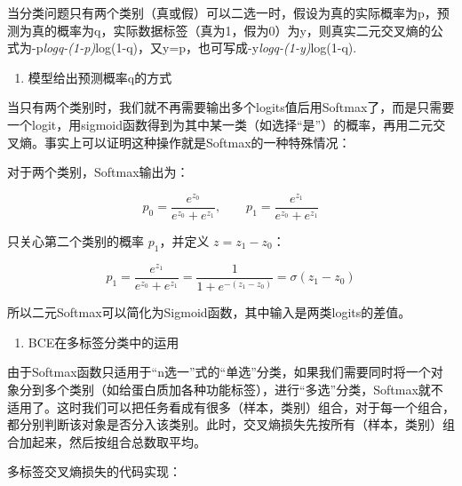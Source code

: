 当分类问题只有两个类别（真或假）可以二选一时，假设为真的实际概率为p，预测为真的概率为q，实际数据标签（真为1，假为0）为y，则真实二元交叉熵的公式为-p\emph{logq-(1-p)}log(1-q)，又y=p，也可写成-y\emph{logq-(1-y)}log(1-q).

\begin{enumerate}
\def\labelenumi{\arabic{enumi}.}
\setcounter{enumi}{1}
\tightlist
\item
  模型给出预测概率q的方式
\end{enumerate}

当只有两个类别时，我们就不再需要输出多个logits值后用Softmax了，而是只需要一个logit，用sigmoid函数得到为其中某一类（如选择``是''）的概率，再用二元交叉熵。事实上可以证明这种操作就是Softmax的一种特殊情况：

对于两个类别，Softmax输出为：

\[
p_0=\frac{e^{z_0}}{e^{z_0}+e^{z_1}},\qquad
p_1=\frac{e^{z_1}}{e^{z_0}+e^{z_1}}
\]

只关心第二个类别的概率 \(p_1\)，并定义 \(z=z_1-z_0\)：

\[
p_1=\frac{e^{z_1}}{e^{z_0}+e^{z_1}}
=\frac{1}{1+e^{-(z_1-z_0)}}
=\sigma(z_1-z_0)
\]

所以二元Softmax可以简化为Sigmoid函数，其中输入是两类logits的差值。

\begin{enumerate}
\def\labelenumi{\arabic{enumi}.}
\setcounter{enumi}{2}
\tightlist
\item
  BCE在多标签分类中的运用
\end{enumerate}

由于Softmax函数只适用于``n选一''式的``单选''分类，如果我们需要同时将一个对象分到多个类别（如给蛋白质加各种功能标签），进行``多选''分类，Softmax就不适用了。这时我们可以把任务看成有很多（样本，类别）组合，对于每一个组合，都分别判断该对象是否分入该类别。此时，交叉熵损失先按所有（样本，类别）组合加起来，然后按组合总数取平均。

多标签交叉熵损失的代码实现：


